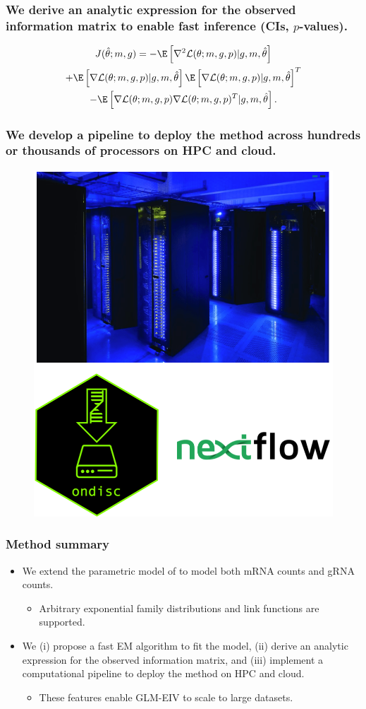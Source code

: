 \documentclass{beamer}
\begin{document}
\begin{frame}
\frametitle{We derive an analytic expression for the observed information matrix to enable fast inference (CIs, $p$-values).}
\begin{multline*}
J(\hat{\theta}; m, g) = -\E \left[\nabla^2 \mathcal{L}(\theta; m, g, p) | g, m, \hat{\theta} \right] \\ + \E\left[ \nabla \mathcal{L}(\theta; m, g, p) |  g, m, \hat{\theta} \right] \E\left[ \nabla \mathcal{L}(\theta; m, g, p) | g, m, \hat{\theta}\right]^T \\ - \E\left[ \nabla\mathcal{L}(\theta; m, g, p) \nabla \mathcal{L}(\theta; m, g, p)^T | g, m, \hat{\theta} \right].
\end{multline*}
\end{frame}

\begin{frame}
\frametitle{We develop a pipeline to deploy the method across hundreds or thousands of processors on HPC and cloud.}

\begin{figure}
	\centering
	\includegraphics[width=0.6\linewidth]{extra_figs/computing}
\end{figure}
\end{frame}

\begin{frame}
\frametitle{Method summary}
\begin{itemize}
\item We extend the parametric model of \cite{Sarkar2021} to model both mRNA counts and gRNA counts.
\begin{itemize}
\item Arbitrary exponential family distributions and link functions are supported. 
\end{itemize}
\item We (i) propose a fast EM algorithm to fit the model, (ii) derive an analytic expression for the observed information matrix, and (iii) implement a computational pipeline to deploy the method on HPC and cloud. 
\begin{itemize}
\item These features enable GLM-EIV to scale to large datasets.
\end{itemize}
\end{itemize}
\end{frame}
\end{document}
